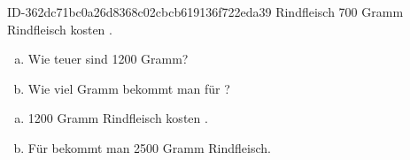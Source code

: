 \begin{exercise}
      {ID-362dc71bc0a26d8368c02cbcb619136f722eda39}
      {Rindfleisch}
  \ifproblem\problem
    \num{700} Gramm Rindfleisch kosten .
    \begin{enumerate}[a)]
      \item Wie teuer sind \num{1200} Gramm?
      \item Wie viel Gramm bekommt man für ?
    \end{enumerate}
  \fi
  \ifoutcome\outcome
    \begin{enumerate}[a)]
      \item \num{1200} Gramm Rindfleisch kosten .
      \item Für  bekommt man \num{2500} Gramm Rindfleisch.
    \end{enumerate}
  \fi
\end{exercise}
